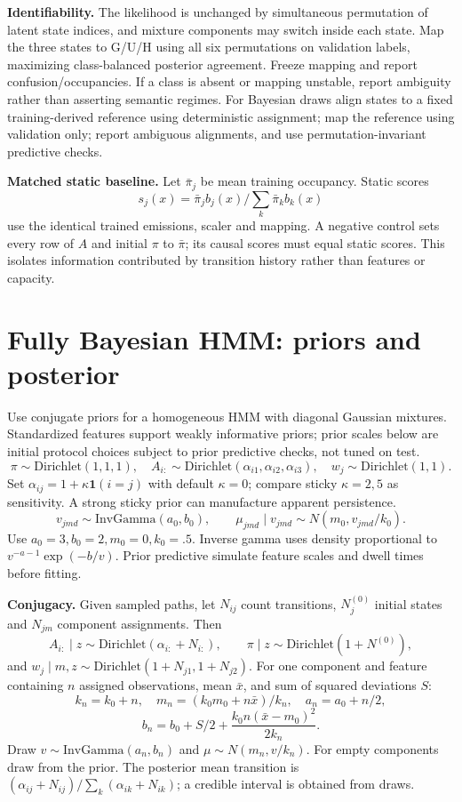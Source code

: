 \documentclass[11pt,letterpaper]{article}
\newcommand{\sectionpage}[1]{\clearpage\section{#1}}
\begin{document}
\textbf{Identifiability.} The likelihood is unchanged by simultaneous permutation of latent state indices, and mixture components may switch inside each state. Map the three states to G/U/H using all six permutations on validation labels, maximizing class-balanced posterior agreement. Freeze mapping and report confusion/occupancies. If a class is absent or mapping unstable, report ambiguity rather than asserting semantic regimes. For Bayesian draws align states to a fixed training-derived reference using deterministic assignment; map the reference using validation only; report ambiguous alignments, and use permutation-invariant predictive checks.

\textbf{Matched static baseline.} Let $\bar\pi_j$ be mean training occupancy. Static scores \[s_j(x)=\bar\pi_jb_j(x)/\sum_k\bar\pi_kb_k(x)\] use the identical trained emissions, scaler and mapping. A negative control sets every row of $A$ and initial $\pi$ to $\bar\pi$; its causal scores must equal static scores. This isolates information contributed by transition history rather than features or capacity.

\sectionpage{Fully Bayesian HMM: priors and posterior}
Use conjugate priors for a homogeneous HMM with diagonal Gaussian mixtures. Standardized features support weakly informative priors; prior scales below are initial protocol choices subject to prior predictive checks, not tuned on test.
\[
\pi\sim\mathrm{Dirichlet}(1,1,1),\quad
A_{i:}\sim\mathrm{Dirichlet}(\alpha_{i1},\alpha_{i2},\alpha_{i3}),
\quad w_j\sim\mathrm{Dirichlet}(1,1).
\]
Set $\alpha_{ij}=1+\kappa\mathbf 1(i=j)$ with default $\kappa=0$; compare sticky $\kappa=2,5$ as sensitivity. A strong sticky prior can manufacture apparent persistence.
\[
v_{jmd}\sim\mathrm{InvGamma}(a_0,b_0),\qquad
\mu_{jmd}\mid v_{jmd}\sim N(m_0,v_{jmd}/k_0).
\]
Use $a_0=3,b_0=2,m_0=0,k_0=.5$. Inverse gamma uses density proportional to $v^{-a-1}\exp(-b/v)$. Prior predictive simulate feature scales and dwell times before fitting.

\textbf{Conjugacy.} Given sampled paths, let $N_{ij}$ count transitions, $N_j^{(0)}$ initial states and $N_{jm}$ component assignments. Then
\[
A_{i:}\mid z\sim\mathrm{Dirichlet}(\alpha_{i:}+N_{i:}),\qquad
\pi\mid z\sim\mathrm{Dirichlet}(1+N^{(0)}),
\]
and $w_j\mid m,z\sim\mathrm{Dirichlet}(1+N_{j1},1+N_{j2})$.
For one component and feature containing $n$ assigned observations, mean $\bar x$, and sum of squared deviations $S$:
\[
k_n=k_0+n,\quad m_n=(k_0m_0+n\bar x)/k_n,\quad a_n=a_0+n/2,
\]
\[
b_n=b_0+S/2+\frac{k_0n(\bar x-m_0)^2}{2k_n}.
\]
Draw $v\sim\mathrm{InvGamma}(a_n,b_n)$ and $\mu\sim N(m_n,v/k_n)$. For empty components draw from the prior. The posterior mean transition is $(\alpha_{ij}+N_{ij})/\sum_k(\alpha_{ik}+N_{ik})$; a credible interval is obtained from draws.
\end{document}
